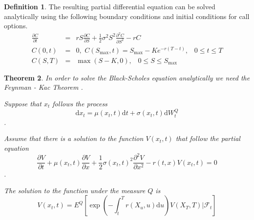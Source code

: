 \documentclass[12pt, oneside]{book}
\theoremstyle{plain}
\newtheorem{theorem}{Theorem}[section]
\theoremstyle{definition}
\newtheorem{definition}[theorem]{Definition}
\begin{document}
\begin{definition}\label{bsBase} The resulting partial differential equation can be solved analytically using the following boundary conditions and initial conditions for call options.
\begin{eqnarray}
\frac{\partial C}{\partial t} &=& rS\frac{\partial C}{\partial S}+\frac{1}{2} \sigma^2 S^2 \frac{\partial^2 C}{\partial S^2} - rC \\[10pt]
C(0,t) &=& 0, \hspace{4pt} C(S_{\max},t)=S_{\max} - K e^{-r(T-t)}, \hspace{10pt} 0 \leq t \leq T \\[10pt]
C(S,T) &=& \max(S-K,0), \hspace{10pt} 0 \leq S \leq S_{\max}
\end{eqnarray}
\end{definition}

\begin{theorem}\label{Feynman}
In order to solve the Black-Scholes equation analytically we need the Feynman - Kac Theorem \cite{klebaner}.

Suppose that $x_t$ follows the process
\begin{equation}
\mathrm{d} x_t = \mu(x_t, t)  \mathrm{d}t + \sigma(x_t, t) \mathrm{d} W_t^Q
\end{equation}.

Assume that there is a solution to the function $V(x_t, t)$ that follow the partial equation
\begin{equation}
\frac{\partial V}{\partial t} +  \mu(x_t, t) \frac{\partial V}{\partial x} + \frac{1}{2} \sigma(x_t, t)^2 \frac{\partial^2 V}{\partial x^2} - r(t, x) V(x_t, t) = 0
\end{equation}.

The solution to the function under the measure $Q$ is
\begin{equation}
V(x_t, t) = E^Q [ \exp(-  \int_{t}^{T} r(X_u, u)  \mathrm{d}u) V(X_T, T) \lvert \mathcal{F}_t]
\end{equation}

\end{theorem}
\end{document}

